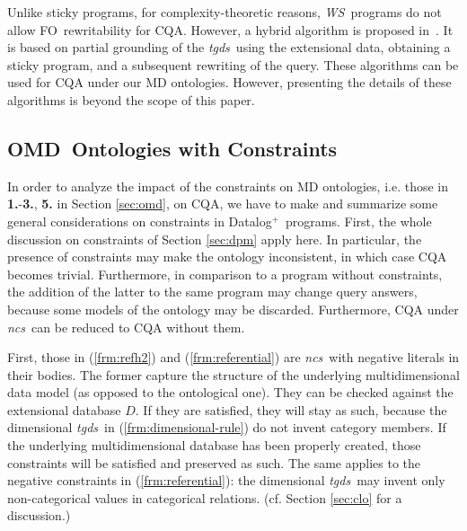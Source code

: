 \documentclass[format=acmsmall, review=false, screen=true]{acmart}
\newcommand{\ignore}[1]{}
\newcommand{\dpm}{{Datalog}$^\pm$}
\newcommand{\dplus}{{Datalog}$^+$}
\newcommand{\m}{\;\!\!}
\newcommand{\WS}{{\em W\m{}S}}
\newcommand{\omd}{OMD}
\newcommand{\fo}{FO}
\newcommand{\tgds}{{\em tgds}}
\newcommand{\ncs}{{\em ncs}}
\newcommand{\red}[1]{{#1}}
\newcommand{\blue}[1]{{#1}}
\newcommand{\comlb}[1]{{\vspace{2mm}\noindent \bf \blue{COMM(LEO):}}~ #1 \hfill {\bf
    END.}\\}
\begin{document}
Unlike sticky programs, for complexity-theoretic reasons, \WS \ programs do not allow \fo \ rewritability for CQA. However, a hybrid algorithm is proposed in~\cite{milani16rr-cali}. It is based on partial grounding of the \tgds \ using the extensional data, obtaining a sticky program, and a subsequent rewriting of the query. These algorithms can be used for CQA under our MD ontologies. However, presenting the details  of these algorithms is beyond the scope of this paper.





\subsection{\omd \ Ontologies with Constraints}\label{sec:withCons}

\red{In order to analyze  the impact of the constraints  on MD ontologies, i.e. those in {\bf 1.}-{\bf 3.}, {\bf 5.} in Section \ref{sec:omd}, on CQA, we have to make and summarize some general considerations on constraints in \dplus \ programs. First, the whole discussion on constraints of Section \ref{sec:dpm} apply here. In particular,
the presence of constraints may make the ontology inconsistent, in which case CQA becomes trivial. Furthermore, in comparison to a program without constraints, the addition of the latter to the same program may change query answers, because some models of the ontology may be discarded. Furthermore, CQA under \ncs \ can be reduced to CQA without them.  }

First, those in (\ref{frm:refh2}) and (\ref{frm:referential}) are \ncs \ with negative literals in their bodies. The former capture the structure of the underlying multidimensional data model (as opposed to the ontological one). They can be checked against the extensional database $D$. If they are satisfied, they will stay as such, because the dimensional \tgds \ in (\ref{frm:dimensional-rule}) do not invent category members. If the underlying multidimensional database has been properly created, those constraints will be satisfied and preserved as such.  The same applies to the negative constraints in (\ref{frm:referential}): the dimensional \tgds \ may invent only non-categorical values in categorical relations. (cf. Section \ref{sec:clo} for a discussion.)\ignore{\footnote{\ For a more general justification,  \ncs \ are harmless because they contain {\em stratified negation}, with which \dplus \ has been extended~\cite{cali13}\ignore{\cite{cali09,cali10}}.}}
\end{document}

